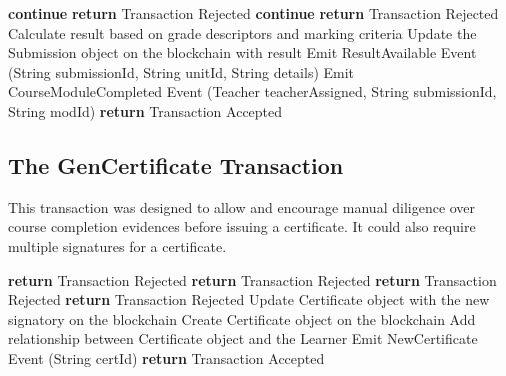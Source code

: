 \begin{algorithm}
	\begin{algorithmic}[0]
		\State \textbf{continue}
		\Else \textbf{ return} Transaction Rejected
		\EndIf
		\State \textbf{continue}
		\Else \textbf{ return} Transaction Rejected
		\EndIf
		\State Calculate result based on grade descriptors and marking criteria
		\State Update the Submission object on the blockchain with result
		\State Emit ResultAvailable Event (String submissionId, String unitId, String details)
		\State Emit CourseModuleCompleted Event (Teacher teacherAssigned, String submissionId, String modId)
		\EndIf
		\EndIf
		\State \textbf{return} Transaction Accepted
		\EndFunction
	\end{algorithmic}
\end{algorithm}

\subsection{The GenCertificate Transaction}

This transaction was designed to allow and encourage manual diligence over course completion evidences before issuing a certificate.
It could also require multiple signatures for a certificate.
\begin{algorithm}
	\begin{algorithmic}[0]
		 \textbf{return} Transaction Rejected \EndIf
		 \textbf{return} Transaction Rejected \EndIf
		\Else
		 \textbf{return} Transaction Rejected \EndIf
		 \textbf{return} Transaction Rejected \EndIf
		\EndIf
		\State Update Certificate object with the new signatory on the blockchain
		\Else
		\State Create Certificate object on the blockchain
		\EndIf
		\State Add relationship between Certificate object and the Learner
		\State Emit NewCertificate Event (String certId)
		\EndIf
		\State \textbf{return} Transaction Accepted
		\EndFunction
	\end{algorithmic}
\end{algorithm}

